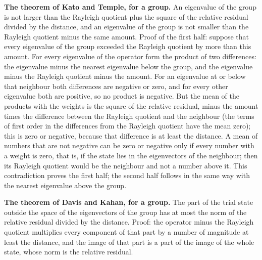 \documentclass[
  10pt,
]{article}
\begin{document}
\textbf{The theorem of Kato and Temple, for a group.} An eigenvalue of
the group is not larger than the Rayleigh quotient plus the square of
the relative residual divided by the distance, and an eigenvalue of the
group is not smaller than the Rayleigh quotient minus the same amount.
Proof of the first half: suppose that every eigenvalue of the group
exceeded the Rayleigh quotient by more than this amount. For every
eigenvalue of the operator form the product of two differences: the
eigenvalue minus the nearest eigenvalue below the group, and the
eigenvalue minus the Rayleigh quotient minus the amount. For an
eigenvalue at or below that neighbour both differences are negative or
zero, and for every other eigenvalue both are positive, so no product is
negative. But the mean of the products with the weights is the square of
the relative residual, minus the amount times the difference between the
Rayleigh quotient and the neighbour (the terms of first order in the
differences from the Rayleigh quotient have the mean zero); this is zero
or negative, because that difference is at least the distance. A mean of
numbers that are not negative can be zero or negative only if every
number with a weight is zero, that is, if the state lies in the
eigenvectors of the neighbour; then its Rayleigh quotient would be the
neighbour and not a number above it. This contradiction proves the first
half; the second half follows in the same way with the nearest
eigenvalue above the group.

\textbf{The theorem of Davis and Kahan, for a group.} The part of the
trial state outside the space of the eigenvectors of the group has at
most the norm of the relative residual divided by the distance. Proof:
the operator minus the Rayleigh quotient multiplies every component of
that part by a number of magnitude at least the distance, and the image
of that part is a part of the image of the whole state, whose norm is
the relative residual.
\end{document}
